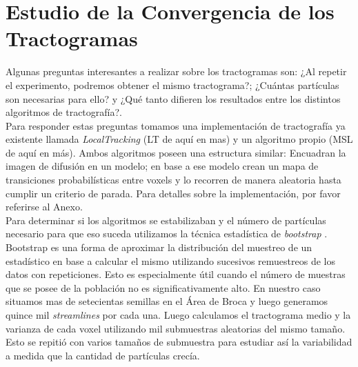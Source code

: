 \section{Estudio de la Convergencia de los Tractogramas}

Algunas preguntas interesantes a realizar sobre los tractogramas son: ¿Al repetir
el experimento, podremos obtener el mismo tractograma?; ¿Cu\'antas part\'iculas son
necesarias para ello? y ¿Qu\'e tanto difieren los resultados entre los distintos 
algoritmos de tractograf\'ia?. \\

Para responder estas preguntas tomamos una implementaci\'on de tractograf\'ia ya 
existente llamada \textit{LocalTracking} (LT de aqu\'i en mas) y un algoritmo
propio (MSL de aqu\'i en m\'as). Ambos algoritmos poseen una estructura 
similar: Encuadran la imagen de difusi\'on en un modelo; en base a ese modelo 
crean un mapa de transiciones probabil\'isticas entre voxels y lo recorren 
de manera aleatoria hasta cumplir un criterio de parada. Para detalles sobre la 
implementaci\'on, por favor referirse al Anexo. \\

Para determinar si los algoritmos se estabilizaban y el n\'umero de part\'iculas
necesario para que eso suceda utilizamos la t\'ecnica estad\'istica de
\textit{bootstrap} \cite{Efron1982}. Bootstrap es una forma de aproximar la
distribuci\'on del muestreo de un estad\'istico en base a calcular el mismo
utilizando sucesivos remuestreos de los datos con repeticiones. Esto es
especialmente \'util cuando el n\'umero de muestras que se posee de la poblaci\'on
no es significativamente alto. En nuestro caso situamos mas de setecientas
semillas en el \'Area de Broca y luego generamos quince mil \textit{streamlines}
por cada una. Luego calculamos el tractograma medio y la varianza de cada voxel 
utilizando mil submuestras aleatorias del mismo tama\~no. Esto se repiti\'o con 
varios tama\~nos de submuestra para estudiar as\'i la variabilidad a medida que 
la cantidad de part\'iculas crec\'ia.\\
